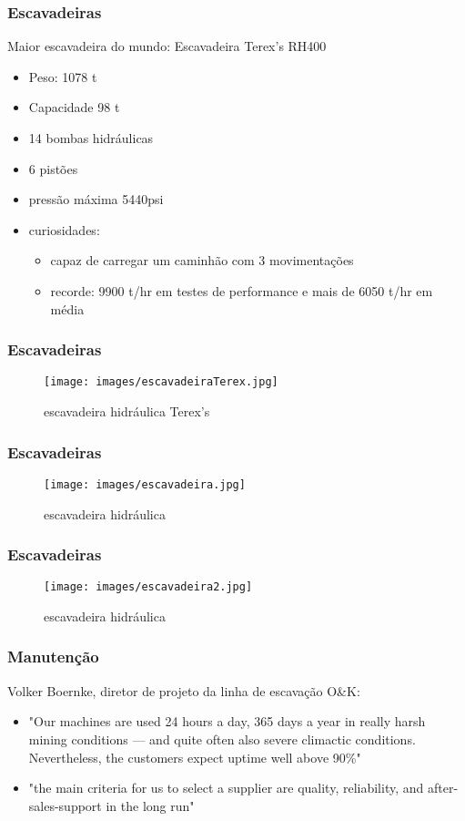 \documentclass{beamer}
\begin{document}
\begin{frame}
	\frametitle{Escavadeiras}
Maior escavadeira do mundo: Escavadeira Terex's RH400
    \begin{itemize}
        \item Peso: 1078 t
        \item Capacidade 98 t
        \item 14 bombas hidráulicas
        \item 6 pistões
        \item pressão máxima 5440psi
        \item curiosidades:
            \begin{itemize}
            \item capaz de carregar um caminhão com 3 movimentações
            \item recorde: 9900 t/hr em testes de performance e mais de 6050 t/hr em média
            \end{itemize}
    \end{itemize}
\end{frame}

\begin{frame}
	\frametitle{Escavadeiras}
    \begin{figure}
    	\centering
    	\texttt{[image: images/escavadeiraTerex.jpg]}
		\caption{escavadeira hidráulica Terex's}
		\label{fig:escavadeiraExemplo}
    \end{figure}
\end{frame}


\begin{frame}
	\frametitle{Escavadeiras}
    \begin{figure}
    	\centering
    	\texttt{[image: images/escavadeira.jpg]}
		\caption{escavadeira hidráulica}
		\label{fig:escavadeira}
    \end{figure}
\end{frame}

\begin{frame}
	\frametitle{Escavadeiras}
    \begin{figure}
    	\centering
    	\texttt{[image: images/escavadeira2.jpg]}
		\caption{escavadeira hidráulica}
		\label{fig:escavadeira2}
    \end{figure}
\end{frame}

\begin{frame}
	\frametitle{Manutenção}
          Volker Boernke, diretor de projeto da linha de escavação O\&K: 
        \begin{itemize}
            \item "Our machines are used 24 hours a day, 365 days a year in really harsh mining conditions — and quite often also severe climactic conditions. Nevertheless, the customers expect uptime well above 90\%"
            \item "the main criteria for us to select a supplier are quality, reliability, and after-sales-support in the long run"
        \end{itemize}
\end{frame}
\end{document}
